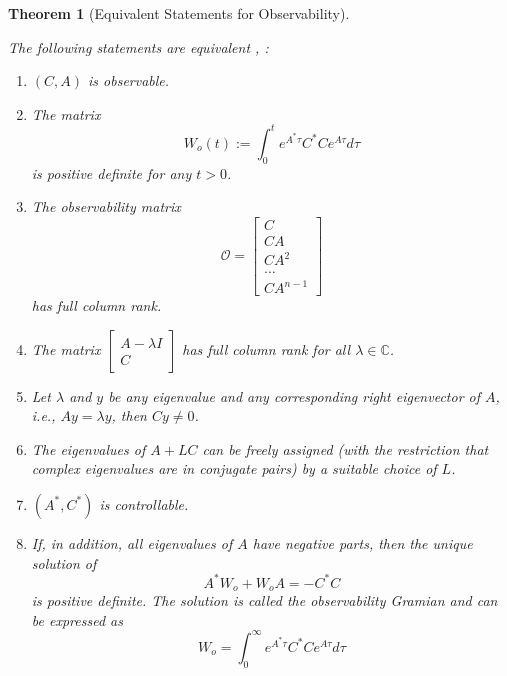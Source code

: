 \documentclass[
]{book}
\newtheorem{theorem}{Theorem}[chapter]
\theoremstyle{definition}
\theoremstyle{definition}
\theoremstyle{definition}
\theoremstyle{definition}
\theoremstyle{remark}
\begin{document}
\begin{theorem}[Equivalent Statements for Observability]
\protect\hypertarget{thm:ltiobservable}{}\label{thm:ltiobservable}

The following statements are equivalent \citep{chen1984book-linear}, \citep{zhou1996book-robust}:

\begin{enumerate}
\def\labelenumi{\arabic{enumi}.}
\item
  \((C, A)\) is observable.
\item
  The matrix
  \begin{equation*}
  W_o(t) := \int_{0}^{t} e^{A^*\tau} C^* C e^{A\tau} d\tau
  \end{equation*}
  is positive definite for any \(t>0\).
\item
  The observability matrix
  \begin{equation*}
  \mathcal{O} = \begin{bmatrix}
     C \\ CA \\ CA^2 \\ \dots \\ CA^{n-1}
  \end{bmatrix}
  \end{equation*}
  has full column rank.
\item
  The matrix \(\begin{bmatrix} A - \lambda I \\ C \end{bmatrix}\) has full column rank for all \(\lambda \in \mathbb{C}\).
\item
  Let \(\lambda\) and \(y\) be any eigenvalue and any corresponding right eigenvector of \(A\), i.e., \(Ay = \lambda y\), then \(Cy \ne 0\).
\item
  The eigenvalues of \(A+LC\) can be freely assigned (with the restriction that complex eigenvalues are in conjugate pairs) by a suitable choice of \(L\).
\item
  \((A^*, C^*)\) is controllable.
\item
  If, in addition, all eigenvalues of \(A\) have negative parts, then the unique solution of
  \begin{equation*} 
  A^* W_o + W_o A = -C^* C 
  \end{equation*}
  is positive definite. The solution is called the \emph{observability Gramian} and can be expressed as
  \begin{equation*}
  W_o = \int_{0}^{\infty} e^{A^*\tau} C^* C e^{A\tau} d\tau
  \end{equation*}
\end{enumerate}

\end{theorem}
\end{document}
